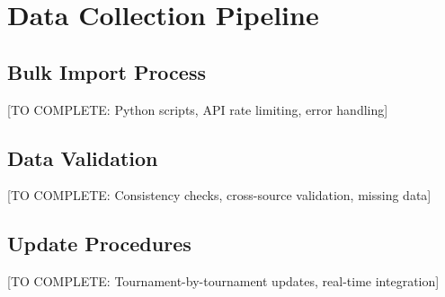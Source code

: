 \section{Data Collection Pipeline}

\subsection{Bulk Import Process}

[TO COMPLETE: Python scripts, API rate limiting, error handling]

\subsection{Data Validation}

[TO COMPLETE: Consistency checks, cross-source validation, missing data]

\subsection{Update Procedures}

[TO COMPLETE: Tournament-by-tournament updates, real-time integration]